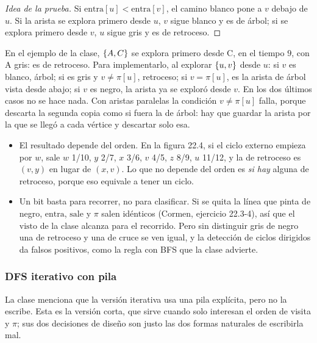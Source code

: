 \documentclass[11pt,letterpaper]{article}
\begin{document}
\begin{proof}[Idea de la prueba]
  Si $\text{entra}[u] < \text{entra}[v]$, el camino blanco pone a $v$
  debajo de $u$. Si la arista se explora primero desde $u$, $v$ sigue
  blanco y es de árbol; si se explora primero desde $v$, $u$ sigue
  gris y es de retroceso.
\end{proof}

En el ejemplo de la clase, $\left\{ A, C \right\}$ se explora primero desde C,
en el tiempo $9$, con A gris: es de retroceso. Para implementarlo, al
explorar $\left\{ u, v \right\}$ desde $u$: si $v$ es blanco, árbol; si es gris y
$v \neq \pi[u]$, retroceso; si $v = \pi[u]$, es la arista de árbol
vista desde abajo; si $v$ es negro, la arista ya se exploró desde $v$.
En los dos últimos casos no se hace nada. Con aristas paralelas la
condición $v \neq \pi[u]$ falla, porque descarta la segunda copia como
si fuera la de árbol: hay que guardar la arista por la que se llegó a
cada vértice y descartar solo esa.

\begin{ojo}
  \begin{itemize}[leftmargin=1.2em, itemsep=0.15em]
    \item El resultado depende del orden. En la figura 22.4, si el
      ciclo externo empieza por $w$, sale $w$ 1/10, $y$ 2/7, $x$ 3/6,
      $v$ 4/5, $z$ 8/9, $u$ 11/12, y la de retroceso es $(v, y)$ en
      lugar de $(x, v)$. Lo que no depende del orden es
      \textit{si hay} alguna de retroceso, porque eso equivale a
      tener un ciclo.
    \item Un bit basta para recorrer, no para clasificar. Si se quita
      la línea que pinta de negro, $\text{entra}$, $\text{sale}$ y
      $\pi$ salen idénticos (Cormen, ejercicio 22.3-4), así que el
      $\text{visto}$ de la clase alcanza para el recorrido. Pero sin
      distinguir gris de negro una de retroceso y una de cruce se ven
      igual, y la detección de ciclos dirigidos da falsos positivos,
      como la regla con BFS que la clase advierte.
  \end{itemize}
\end{ojo}

\subsubsection*{DFS iterativo con pila}

La clase menciona que la versión iterativa usa una pila explícita,
pero no la escribe. Esta es la versión corta, que sirve cuando solo
interesan el orden de visita y $\pi$; sus dos decisiones de diseño son
justo las dos formas naturales de escribirla mal.
\end{document}
